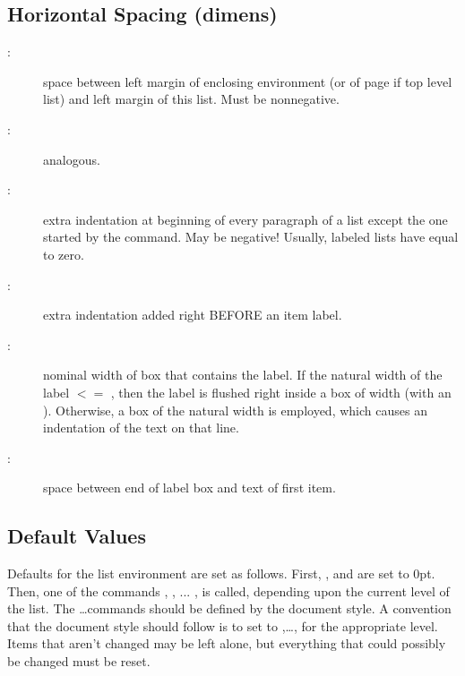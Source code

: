  \subsection{Horizontal Spacing (dimens)}
 \begin{description}
 \item[:] space between left margin of enclosing
   environment (or of page if top level list) and left margin of
                     this list.  Must be nonnegative.
  \item[:] analogous.
  \item[:] extra indentation at beginning of every
     paragraph of a list except the one started by the 
                      command.  May be negative!  Usually, labeled
                       lists have  equal to zero.
   \item[:] extra indentation added right BEFORE an item
                      label.
  \item[:] nominal width of box that contains the label.
                      If the natural width of the
                         label $< =$ ,
                      then the label is flushed right inside a box
                      of width  (with an ).
                      Otherwise,
                      a box of the natural width is employed, which
                       causes an indentation of the text on that line.
     \item[:] space between end of label box and text of
                      first item.
  \end{description}





 \subsection{Default Values}
 
 Defaults for the list environment are set as follows.
 First, ,  and 
 are set
      to 0pt.  Then, one of the commands
      , , ... , 
      is called, depending upon the current level of the list.
      The  \ldots commands should be defined by the document
      style.  A convention that the document style should follow is
      to set  to
      ,\ldots,  for
      the appropriate level.  Items that aren't changed may be left
      alone, but everything that could possibly be changed must be
      reset.


